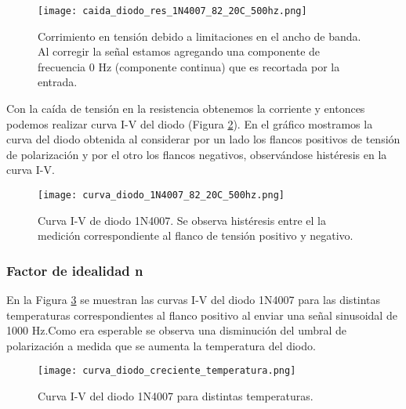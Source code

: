 \documentclass[a4paper, 11pt]{article}
\begin{document}
\begin{figure} [H]
\centering
\texttt{[image: caida\_diodo\_res\_1N4007\_82\_20C\_500hz.png]}
\caption{Corrimiento en tensión debido a limitaciones en el ancho de banda. Al corregir la señal estamos agregando una componente de frecuencia 0 Hz (componente continua) que es recortada por la entrada. \label{fig:caida_diodo_res_1N4007_82_20C_500hz}}
\end{figure} 

Con la caída de tensión en la resistencia obtenemos la corriente y entonces podemos realizar curva I-V del diodo (Figura \ref{fig:curva_diodo_1N4007_82_20C_500hz}). En el gráfico mostramos la curva del diodo obtenida al considerar por un lado los flancos positivos de tensión de polarización y por el otro los flancos negativos, observándose histéresis en la curva I-V. 

\begin{figure} [H]
\centering
\texttt{[image: curva\_diodo\_1N4007\_82\_20C\_500hz.png]}
\caption{Curva I-V de diodo 1N4007. Se observa histéresis entre el la medición correspondiente al flanco de tensión positivo y negativo. \label{fig:curva_diodo_1N4007_82_20C_500hz}}
\end{figure} 



\subsubsection*{Factor de idealidad n}

En la Figura \ref{fig:curva_diodo_creciente_temperatura} se muestran las curvas I-V del diodo 1N4007 para las distintas temperaturas correspondientes al flanco positivo al enviar una señal sinusoidal de 1000 Hz.Como era esperable se observa una disminución del umbral de polarización a medida que se aumenta la temperatura del diodo.

\begin{figure} [H]
\centering
\texttt{[image: curva\_diodo\_creciente\_temperatura.png]}
\caption{Curva I-V del diodo 1N4007 para distintas temperaturas. \label{fig:curva_diodo_creciente_temperatura}}
\end{figure} 
\end{document}
